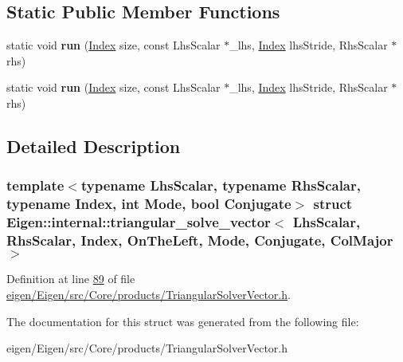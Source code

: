 \subsection*{Static Public Member Functions}
\begin{DoxyCompactItemize}
\item 
\mbox{\label{struct_eigen_1_1internal_1_1triangular__solve__vector_3_01_lhs_scalar_00_01_rhs_scalar_00_01_ind063e019bb54cf6ae298090bc534a9cdf_af1bb92ef8bbe69c4c298a5bb9652b2ed}} 
static void {\bfseries run} (\hyperlink{namespace_eigen_a62e77e0933482dafde8fe197d9a2cfde}{Index} size, const Lhs\+Scalar $\ast$\+\_\+lhs, \hyperlink{namespace_eigen_a62e77e0933482dafde8fe197d9a2cfde}{Index} lhs\+Stride, Rhs\+Scalar $\ast$rhs)
\item 
\mbox{\label{struct_eigen_1_1internal_1_1triangular__solve__vector_3_01_lhs_scalar_00_01_rhs_scalar_00_01_ind063e019bb54cf6ae298090bc534a9cdf_af1bb92ef8bbe69c4c298a5bb9652b2ed}} 
static void {\bfseries run} (\hyperlink{namespace_eigen_a62e77e0933482dafde8fe197d9a2cfde}{Index} size, const Lhs\+Scalar $\ast$\+\_\+lhs, \hyperlink{namespace_eigen_a62e77e0933482dafde8fe197d9a2cfde}{Index} lhs\+Stride, Rhs\+Scalar $\ast$rhs)
\end{DoxyCompactItemize}


\subsection{Detailed Description}
\subsubsection*{template$<$typename Lhs\+Scalar, typename Rhs\+Scalar, typename Index, int Mode, bool Conjugate$>$\newline
struct Eigen\+::internal\+::triangular\+\_\+solve\+\_\+vector$<$ Lhs\+Scalar, Rhs\+Scalar, Index, On\+The\+Left, Mode, Conjugate, Col\+Major $>$}



Definition at line \hyperlink{eigen_2_eigen_2src_2_core_2products_2_triangular_solver_vector_8h_source_l00089}{89} of file \hyperlink{eigen_2_eigen_2src_2_core_2products_2_triangular_solver_vector_8h_source}{eigen/\+Eigen/src/\+Core/products/\+Triangular\+Solver\+Vector.\+h}.



The documentation for this struct was generated from the following file\+:\begin{DoxyCompactItemize}
\item 
eigen/\+Eigen/src/\+Core/products/\+Triangular\+Solver\+Vector.\+h\end{DoxyCompactItemize}
